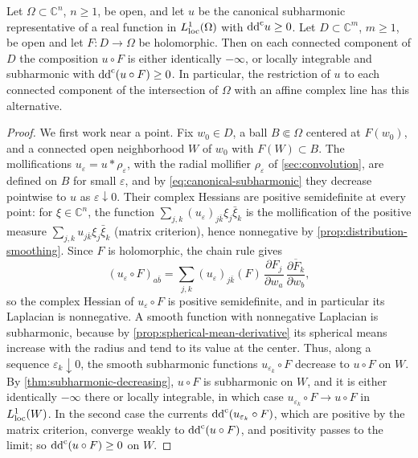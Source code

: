 \begin{proposition}\label{prop:positive-hessian-holomorphic-composition}
Let $\Omega\subset\mathbb{C}^n$, $n\geq1$, be open, and let $u$ be the canonical subharmonic representative of a real function in $L^1_{\mathrm{loc}}(\Omega)$ with $\mathrm{dd}^{\mathrm{c}} u\ge0$. Let $D\subset\mathbb{C}^m$, $m\ge1$, be open and let $F\colon D\to\Omega$ be holomorphic. Then on each connected component of $D$ the composition $u\circ F$ is either identically $-\infty$, or locally integrable and subharmonic with $\mathrm{dd}^{\mathrm{c}}(u\circ F)\geq0$. In particular, the restriction of $u$ to each connected component of the intersection of $\Omega$ with an affine complex line has this alternative.
\end{proposition}
\begin{proof}
We first work near a point. Fix $w_0\in D$, a ball $B\Subset\Omega$ centered at $F(w_0)$, and a connected open neighborhood $W$ of $w_0$ with $F(W)\subset B$. The mollifications $u_\varepsilon=u*\rho_\varepsilon$, with the radial mollifier $\rho_\varepsilon$ of \cref{sec:convolution}, are defined on $B$ for small $\varepsilon$, and by \eqref{eq:canonical-subharmonic} they decrease pointwise to $u$ as $\varepsilon\downarrow0$. Their complex Hessians are positive semidefinite at every point: for $\xi\in\mathbb C^n$, the function $\sum_{j,k}(u_\varepsilon)_{j\bar k}\xi_j\bar\xi_k$ is the mollification of the positive measure $\sum_{j,k}u_{j\bar k}\xi_j\bar\xi_k$ (matrix criterion), hence nonnegative by \cref{prop:distribution-smoothing}. Since $F$ is holomorphic, the chain rule gives
\[
 (u_\varepsilon\circ F)_{a\bar b}
 =\sum_{j,k}(u_\varepsilon)_{j\bar k}(F)\,
   \frac{\partial F_j}{\partial w_a}\,
   \overline{\frac{\partial F_k}{\partial w_b}},
\]
so the complex Hessian of $u_\varepsilon\circ F$ is positive semidefinite, and in particular its Laplacian is nonnegative. A smooth function with nonnegative Laplacian is subharmonic, because by \cref{prop:spherical-mean-derivative} its spherical means increase with the radius and tend to its value at the center. Thus, along a sequence $\varepsilon_k\downarrow0$, the smooth subharmonic functions $u_{\varepsilon_k}\circ F$ decrease to $u\circ F$ on $W$. By \cref{thm:subharmonic-decreasing}, $u\circ F$ is subharmonic on $W$, and it is either identically $-\infty$ there or locally integrable, in which case $u_{\varepsilon_k}\circ F\to u\circ F$ in $L^1_{\mathrm{loc}}(W)$. In the second case the currents $\mathrm{dd}^{\mathrm{c}}(u_{\varepsilon_k}\circ F)$, which are positive by the matrix criterion, converge weakly to $\mathrm{dd}^{\mathrm{c}}(u\circ F)$, and positivity passes to the limit; so $\mathrm{dd}^{\mathrm{c}}(u\circ F)\geq0$ on $W$.


\end{proof}
